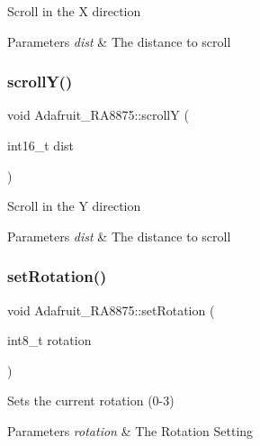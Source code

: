 Scroll in the X direction


\begin{DoxyParams}{Parameters}
{\em dist} & The distance to scroll \\
\hline
\end{DoxyParams}
\mbox{\label{class_adafruit___r_a8875_ab5c46f0b877fadea657548e2f7755a03}} 
\subsubsection{\texorpdfstring{scrollY()}{scrollY()}}
{\footnotesize\ttfamily void Adafruit\+\_\+\+R\+A8875\+::scrollY (\begin{DoxyParamCaption}\item[{int16\+\_\+t}]{dist }\end{DoxyParamCaption})}

Scroll in the Y direction


\begin{DoxyParams}{Parameters}
{\em dist} & The distance to scroll \\
\hline
\end{DoxyParams}
\mbox{\label{class_adafruit___r_a8875_ae63649355c69e89318a1fbaf201bcdf5}} 
\subsubsection{\texorpdfstring{setRotation()}{setRotation()}}
{\footnotesize\ttfamily void Adafruit\+\_\+\+R\+A8875\+::set\+Rotation (\begin{DoxyParamCaption}\item[{int8\+\_\+t}]{rotation }\end{DoxyParamCaption})}

Sets the current rotation (0-\/3)


\begin{DoxyParams}{Parameters}
{\em rotation} & The Rotation Setting \\
\hline
\end{DoxyParams}
\mbox{\label{class_adafruit___r_a8875_a6a07a16e5b32d1c0feec94b34290e6b1}} 
